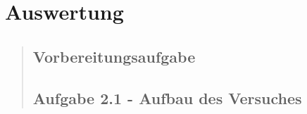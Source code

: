 \section{Auswertung}
\begin{quote}
    
    \subsection{Vorbereitungsaufgabe}
    \begin{quote}
        
    \end{quote}  %
    
    \subsection{Aufgabe 2.1 - Aufbau des Versuches}
    \begin{quote}
        

\end{quote}
\end{quote}
